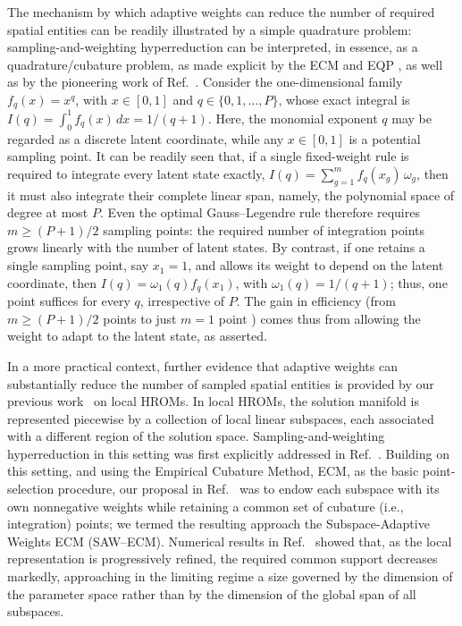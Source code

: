 \documentclass[preprint,10pt]{elsarticle}  %
\begin{document}
 The mechanism by which adaptive weights can reduce the number of
required spatial entities can be readily illustrated by a simple
quadrature problem: sampling-and-weighting hyperreduction can be
interpreted, in essence, as a quadrature/cubature problem, as made
explicit by the ECM and EQP
\cite{hernandez2017dimensional,yano2019lp}, as well as by the pioneering
work of Ref.~\cite{an2009optimizing}. Consider the one-dimensional family
\(f_q(x)=x^q\), with \(x\in[0,1]\) and
\(q\in\{0,1,\ldots,P\}\), whose exact integral is
\(I(q)=\int_0^1 f_q(x)\,dx=1/(q+1)\). Here, the monomial exponent
\(q\) may be regarded as a discrete latent coordinate, while any
\(x\in[0,1]\) is a potential sampling point. It can be readily seen that, if a single fixed-weight rule is required
to integrate every latent state exactly,  $I(q) = \sum_{g=1}^{m} f_q(x_g)\,\omega_g$,
then it must also integrate
their complete linear span, namely, the polynomial space
of degree at most \(P\). Even the optimal Gauss--Legendre rule therefore
requires \(m\geq (P+1)/2 \) sampling points: the
required number of integration points grows linearly with the number
of latent states. By contrast, if one retains a single sampling point,
say \(x_1=1\), and allows its weight to depend on the latent coordinate,
then \(I(q)=\omega_1(q)f_q(x_1)\), with \(\omega_1(q)=1/(q+1)\); thus, one
point suffices for every \(q\), irrespective of \(P\).  The gain in efficiency (from \(m\geq (P+1)/2 \) points to just $m=1$ point ) comes thus
  from allowing the weight to adapt to the latent state, as asserted.



In a more practical context, further evidence that adaptive weights can
substantially reduce the number of sampled spatial entities is provided
by our previous work~\cite{bravo2024subspace} on
local HROMs. In local HROMs, the solution manifold is represented
piecewise by a collection of local linear subspaces, each associated
with a different region of the solution space. Sampling-and-weighting
hyperreduction in this setting was first explicitly addressed in Ref.~\cite{grimberg2021mesh}. Building on this setting, and
using the Empirical Cubature Method, ECM, as the basic point-selection
procedure, our proposal in Ref.~\cite{bravo2024subspace} was to endow
each subspace with its own nonnegative weights while retaining a common
set of cubature (i.e., integration) points; we termed the resulting
approach the Subspace-Adaptive Weights ECM (SAW--ECM). Numerical
results  in Ref.~\cite{bravo2024subspace} showed that, as the local representation is progressively
refined, the required common support decreases markedly, approaching
in the limiting regime a size governed by the  dimension of the parameter space rather than by the dimension of the global span of all
subspaces.
\end{document}
